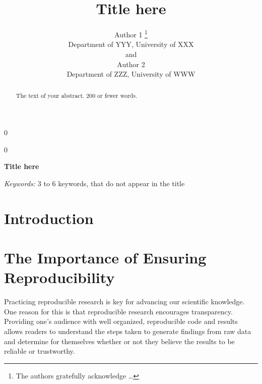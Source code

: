 \documentclass[12pt]{article}
\newcommand{\blind}{0}
\begin{document}
\def\spacingset#1{\renewcommand{\baselinestretch}%
{#1}\small\normalsize} \spacingset{1}



\blind
{
  \title{\bf Title here}

  \author{
        Author 1 \thanks{The authors gratefully acknowledge \ldots{}} \\
    Department of YYY, University of XXX\\
     and \\     Author 2 \\
    Department of ZZZ, University of WWW\\
      }
  \maketitle
} \fi

\blind
{
  \bigskip
  \bigskip
  \bigskip
  \begin{center}
    {\LARGE\bf Title here}
  \end{center}
  \medskip
} \fi

\bigskip
\begin{abstract}
The text of your abstract. 200 or fewer words.
\end{abstract}

\noindent%
{\it Keywords:} 3 to 6 keywords, that do not appear in the title
\vfill

\newpage
\spacingset{1.45} %

\section{Introduction}\label{introduction}

\section{The Importance of Ensuring
Reproducibility}\label{the-importance-of-ensuring-reproducibility}

Practicing reproducible research is key for advancing our scientific
knowledge. One reason for this is that reproducible research encourages
transparency. Providing one's audience with well organized, reproducible
code and results allows readers to understand the steps taken to
generate findings from raw data and determine for themselves whether or
not they believe the results to be reliable or trustworthy.
\end{document}

